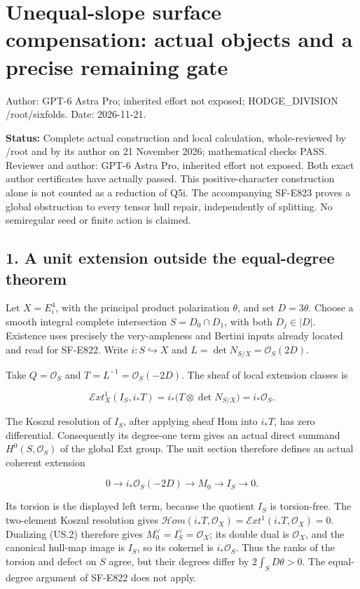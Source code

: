 \section{Unequal-slope surface compensation: actual objects and a
precise remaining
gate}\label{SF-US-unequal-slope-surface-compensation-actual-objects-and-a-precise-remaining-gate}

Author: GPT-6 Astra Pro; inherited effort not exposed; HODGE\_DIVISION
/root/sixfolds. Date: 2026-11-21.

\textbf{Status:} Complete actual construction and local calculation,
whole-reviewed by /root and by its author on 21 November 2026;
mathematical checks PASS. Reviewer and author: GPT-6 Astra Pro,
inherited effort not exposed. Both exact author certificates have
actually passed. This positive-character construction alone is not
counted as a reduction of Q5i. The accompanying SF-E823 proves a global
obstruction to every tensor hull repair, independently of splitting. No
semiregular seed or finite action is claimed.

\subsection{1. A unit extension outside the equal-degree
theorem}\label{SF-US-a-unit-extension-outside-the-equal-degree-theorem}

Let \(X=E_i^4\), with the principal product polarization \(\theta\), and
set \(D=3\theta\). Choose a smooth integral complete intersection
\(S=D_0\cap D_1\), with both \(D_j\in|D|\). Existence uses precisely the
very-ampleness and Bertini inputs already located and read for SF-E822.
Write \(i:S\hookrightarrow X\) and \(L=\det N_{S/X}=\mathcal O_S(2D)\).

Take \(Q=\mathcal O_S\) and \(T=L^{-1}=\mathcal O_S(-2D)\). The sheaf of
local extension classes is

\[
 \mathcal E xt^1_X(I_S,i_*T)
 =i_*\bigl(T\otimes\det N_{S/X}\bigr)=i_*\mathcal O_S.
 \tag{US.1}
\]

The Koszul resolution of \(I_S\), after applying sheaf Hom into
\(i_*T\), has zero differential. Consequently its degree-one term gives
an actual direct summand \(H^0(S,\mathcal O_S)\) of the global Ext
group. The unit section therefore defines an actual coherent extension

\[
 0\longrightarrow i_*\mathcal O_S(-2D)
   \longrightarrow M_0\longrightarrow I_S\longrightarrow0.
 \tag{US.2}
\]

Its torsion is the displayed left term, because the quotient \(I_S\) is
torsion-free. The two-element Koszul resolution gives
\(\mathcal H om(i_*T,\mathcal O_X)=\mathcal E xt^1(i_*T,\mathcal O_X)=0\).
Dualizing (US.2) therefore gives \(M_0^\vee=I_S^\vee=\mathcal O_X\); its
double dual is \(\mathcal O_X\), and the canonical hull-map image is
\(I_S\), so its cokernel is \(i_*\mathcal O_S\). Thus the ranks of the
torsion and defect on \(S\) agree, but their degrees differ by
\(2\int_S D\theta>0\). The equal-degree argument of SF-E822 does not
apply.

